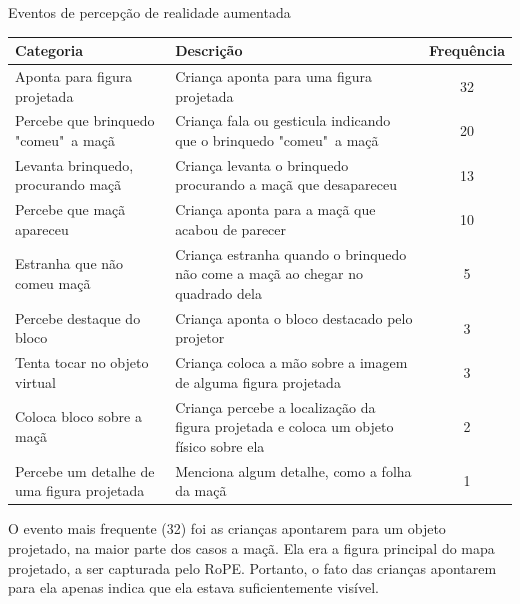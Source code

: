 \begin{quadro}[!h]
    \begin{table_env}
    \caption{Eventos de percepção de realidade aumentada}
     \label{quadro:percepcao_ra}
     \begin{tabular}{@{}l m{} c@{}}
        \toprule
        Categoria                                      & Descrição                                                                             & Frequência \\ \midrule
        Aponta para figura projetada                   & Criança aponta para uma figura projetada                                              & 32 \\
        Percebe que brinquedo "comeu"\ a maçã           & Criança fala ou gesticula indicando que o brinquedo "comeu"\ a maçã                   & 20 \\
        Levanta brinquedo, procurando maçã             & Criança levanta o brinquedo procurando a maçã que desapareceu                         & 13 \\
        Percebe que maçã apareceu                      & Criança aponta para a maçã que acabou de parecer                                      & 10 \\
        Estranha que não comeu maçã                    & Criança estranha quando o brinquedo não come a maçã ao chegar no quadrado dela        & 5 \\
        Percebe destaque do bloco                      & Criança aponta o bloco destacado pelo projetor                                        & 3 \\
        Tenta tocar no objeto virtual                  & Criança coloca a mão sobre a imagem de alguma figura projetada                        & 3 \\
        Coloca bloco sobre a maçã                      & Criança percebe a localização da figura projetada e coloca um objeto físico sobre ela & 2 \\
        Percebe um detalhe de uma figura projetada     & Menciona algum detalhe, como a folha da maçã                                          & 1 \\ \bottomrule
        \end{tabular}
    \end{table_env}
    \sourceauthor
 \end{quadro}

O evento mais frequente (32) foi as crianças apontarem para um objeto projetado, na maior parte dos casos a maçã. Ela era a figura principal do mapa projetado, a ser capturada pelo RoPE. Portanto, o fato das crianças apontarem para ela apenas indica que ela estava suficientemente visível.
 
